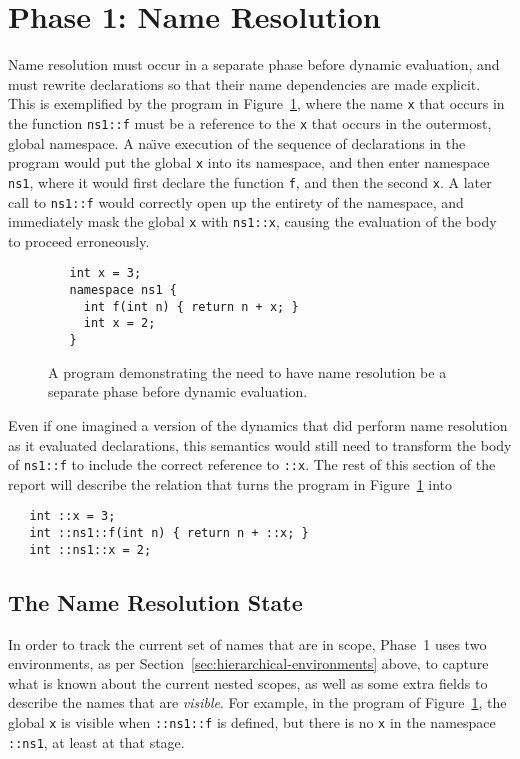 \documentclass[11pt]{article}
\newcommand{\naive}{na\"\i{}ve}
\begin{document}
\section{Phase 1: Name Resolution}
\label{sec:phase1}

Name resolution must occur in a separate phase before dynamic
evaluation, and must rewrite declarations so that their name
dependencies are made explicit.  This is exemplified by the program in
Figure~\ref{fig:name-res-separate-phase}, where the name \texttt{x}
that occurs in the function \texttt{ns1::f} must be a reference to the
\texttt{x} that occurs in the outermost, global namespace.  A \naive{}
execution of the sequence of declarations in the program would put the
global \texttt{x} into its namespace, and then enter namespace
\texttt{ns1}, where it would first declare the function \texttt{f},
and then the second \texttt{x}.  A later call to \texttt{ns1::f} would
correctly open up the entirety of the namespace, and immediately mask
the global \texttt{x} with \texttt{ns1::x}, causing the evaluation of
the body to proceed erroneously.
\begin{figure}[htbp]
\begin{verbatim}
   int x = 3;
   namespace ns1 {
     int f(int n) { return n + x; }
     int x = 2;
   }
\end{verbatim}
\caption{A program demonstrating the need to have name resolution be a
  separate phase before dynamic evaluation.}
\label{fig:name-res-separate-phase}
\end{figure}

Even if one imagined a version of the dynamics that did perform name
resolution as it evaluated declarations, this semantics would still
need to transform the body of \texttt{ns1::f} to include the correct
reference to \texttt{::x}.  The rest of this section of the report
will describe the relation that turns the program in
Figure~\ref{fig:name-res-separate-phase} into
\begin{verbatim}
   int ::x = 3;
   int ::ns1::f(int n) { return n + ::x; }
   int ::ns1::x = 2;
\end{verbatim}

\subsection{The Name Resolution State}
\label{sec:name-resol-state}

In order to track the current set of names that are in scope, Phase~1
uses two environments, as per
Section~\ref{sec:hierarchical-environments} above, to capture what is
known about the current nested scopes, as well as some extra fields to
describe the names that are \emph{visible}.  For example, in the
program of Figure~\ref{fig:name-res-separate-phase}, the global
\texttt{x} is visible when \texttt{::ns1::f} is defined, but there is
no \texttt{x} in the namespace \texttt{::ns1}, at least at that stage.
\end{document}
